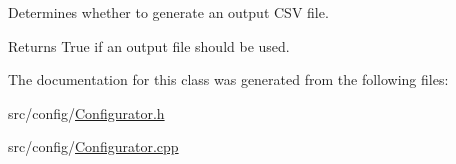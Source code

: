 Determines whether to generate an output C\+S\+V file. 

\begin{DoxyReturn}{Returns}
True if an output file should be used. 
\end{DoxyReturn}


The documentation for this class was generated from the following files\+:\begin{DoxyCompactItemize}
\item 
src/config/\hyperlink{_configurator_8h}{Configurator.\+h}\item 
src/config/\hyperlink{_configurator_8cpp}{Configurator.\+cpp}\end{DoxyCompactItemize}
